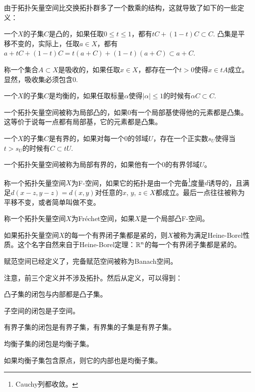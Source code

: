 \begin{para}
由于拓扑矢量空间比交换拓扑群多了一个数乘的结构，这就导致了如下的一些定义：
\begin{compactenum}
\item 一个$X$的子集$C$是凸的，如果任取$0\leq t\leq 1$，都有$tC+(1-t)C\subset C$. 凸集是平移不变的，实际上，任取$a\in X$，都有$a+tC+(1-t)C=t(a+C)+(1-t)(a+C)\subset a+C$.

\item 称一个集合$A\subset X$是吸收的，如果任取$x\in X$，都存在一个$t>0$使得$x\in tA$成立。显然，吸收集必须包含$0$.

\item 一个$X$的子集$C$是均衡的，如果任取标量$\alpha$使得$|\alpha|\leq 1$的时候有$\alpha C\subset C$.

\item 一个拓扑矢量空间被称为局部凸的，如果$0$有一个局部基使得他的元素都是凸集。这等价于说每一点都有局部基，它的元素都是凸集。

\item 一个$X$的子集$C$是有界的，如果对每一个$0$的邻域$U$，存在一个正实数$s_U$使得当$t>s_U$的时候有$C\subset tU$.

\item 一个拓扑矢量空间被称为局部有界的，如果他有一个$0$的有界邻域$U$。

\item 称一个拓扑矢量空间$X$为F-空间，如果它的拓扑是由一个完备\footnote{Cauchy列都收敛。}度量$d$诱导的，且满足$d(x-z,y-z)=d(x,y)$对任意的$x$, $y$, $z\in X$都成立。最后一点往往被称为平移不变，或者简单叫做不变。

\item 称一个拓扑矢量空间$X$为Fr\'{e}chet空间，如果$X$是一个局部凸F-空间。

\item 如果拓扑矢量空间$X$的每一个有界闭子集都是紧的，则$X$被称为满足Heine-Borel性质。这个名字自然来自于Heine-Borel定理：$\mathbb{R}^n$的每一个有界闭子集都是紧的。

\item 赋范空间已经定义了，完备赋范空间被称为Banach空间。
\end{compactenum}
\end{para}

注意，前三个定义并不涉及拓扑。然后从定义，可以得到：
\begin{compactenum}
\item 凸子集的闭包与内部都是凸子集。
\item 子空间的闭包是子空间。
\item 有界子集的闭包是有界子集，有界集的子集是有界子集。
\item 均衡子集的闭包是均衡子集。
\item 如果均衡子集包含原点，则它的内部也是均衡子集。
\end{compactenum}

